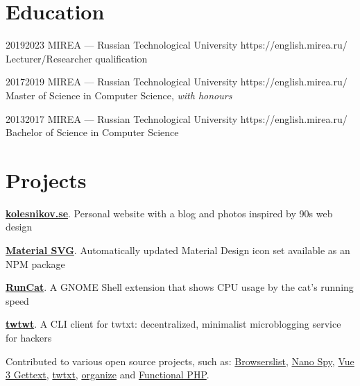 \documentclass[10pt]{article}
\begin{document}
\vspace{-.5\baselineskip}


\section{Education}

\education
	{2019}{2023}
	{MIREA --- Russian Technological University}
	{https://english.mirea.ru/}
	{}
	{Lecturer/Researcher qualification}

\education
	{2017}{2019}
	{MIREA --- Russian Technological University}
	{https://english.mirea.ru/}
	{}
	{Master of Science in Computer Science, \textit{with honours}}

\education
	{2013}{2017}
	{MIREA --- Russian Technological University}
	{https://english.mirea.ru/}
	{}
	{Bachelor of Science in Computer Science}


\section{Projects}

\begin{compactitemize}
	\item \textbf{\href{https://kolesnikov.se/}{kolesnikov.se}}. Personal website with a blog and photos inspired by 90s web design
	\item \textbf{\href{https://github.com/cloudblue/material-svg}{Material SVG}}. Automatically updated Material Design icon set available as an NPM package
	\item \textbf{\href{https://github.com/win0err/gnome-runcat}{RunCat}}. A GNOME Shell extension that shows CPU usage by the cat's running speed
	\item \textbf{\href{https://github.com/win0err/twtwt}{twtwt}}. A CLI client for twtxt: decentralized, minimalist microblogging service for hackers
\end{compactitemize}

Contributed to various open source projects, such as:
\href{https://github.com/browserslist/browserslist/pulls?q=author:win0err}{Browserslist},
\href{https://github.com/ai/nanospy/pulls?q=author:win0err}{Nano Spy},
\href{https://github.com/jshmrtn/vue3-gettext/pulls?q=author:win0err}{Vue 3 Gettext},
\href{https://github.com/buckket/twtxt/pulls?q=author:win0err}{twtxt},
\href{https://github.com/tfeldmann/organize/pulls?q=author:win0err}{organize} and \href{https://github.com/lstrojny/functional-php/pulls?q=author:win0err}{Functional PHP}.
\end{document}
